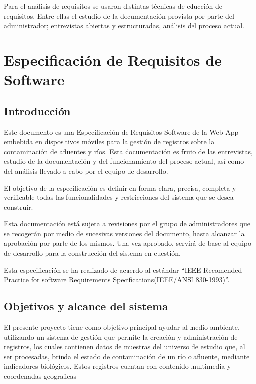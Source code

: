       Para el análisis de requisitos se usaron distintas técnicas de educción de requisitos. Entre ellas el estudio de la documentación provista por parte del administrador; entrevistas abiertas y estructuradas, análisis del proceso actual.

  \section{Especificación de Requisitos de Software}

    \renewcommand{\thesubsection}{\arabic{subsection}}
    \subsection{Introducción}

      Este documento es una Especificación de Requisitos Software de la  Web App embebida en dispositivos móviles para la gestión de registros sobre la contaminación de afluentes y ríos. Esta documentación es fruto de las entrevistas, estudio de la documentación y del funcionamiento del proceso actual, así como del análisis llevado a cabo por el equipo de desarrollo.

      El objetivo de la especificación es definir en forma clara, precisa, completa y verificable todas las funcionalidades y restricciones del sistema que se desea construir.

      Esta documentación está sujeta a revisiones por el grupo de administradores que se recogerán por medio de sucesivas versiones del documento, hasta alcanzar la aprobación por parte de los mismos. Una vez aprobado, servirá de base al equipo de desarrollo para la construcción del sistema en cuestión.

      Esta especificación se ha realizado de acuerdo al estándar “IEEE Recomended Practice for software Requirements Specifications(IEEE/ANSI 830-1993)”.


    \subsection{Objetivos y alcance del sistema}

      El presente proyecto tiene como objetivo principal ayudar al medio ambiente, utilizando un sistema de gestión que permite la creación y administración de registros, los cuales contienen datos de muestras del universo de estudio que, al ser procesadas, brinda el estado de contaminación de un río o afluente, mediante indicadores biológicos.
      Estos registros cuentan con contenido multimedia y coordenadas geograficas

